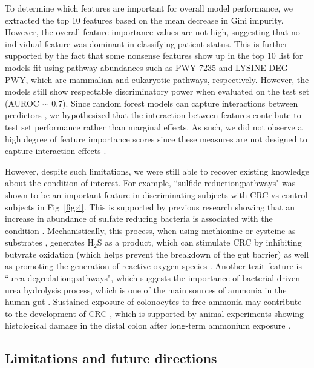 \documentclass{bmcart}
\begin{document}
To determine which features are important for overall model performance, we extracted the top 10 features based on the mean decrease in Gini impurity. However, the overall feature importance values are not high, suggesting that no individual feature was dominant in classifying patient status. This is further supported by the fact that some nonsense features show up in the top 10 list for models fit using pathway abundances such as PWY-7235 and LYSINE-DEG-PWY, which are mammalian and eukaryotic pathways, respectively. However, the models still show respectable discriminatory power when evaluated on the test set (AUROC $\sim$ 0.7). Since random forest models can capture interactions between predictors \cite{hastie2009elements}, we hypothesized that the interaction between features contribute to test set performance rather than marginal effects. As such, we did not observe a high degree of feature importance scores since these measures are not designed to capture interaction effects \cite{wright2016little}. 

However, despite such limitations, we were still able to recover existing knowledge about the condition of interest. For example, ``sulfide reduction;pathways" was shown to be an important feature in discriminating subjects with CRC vs control subjects in Fig~\ref{fig:4}. This is supported by previous research showing that an increase in abundance of sulfate reducing bacteria is associated with the condition \cite{yachida2019metagenomic}. Mechanistically, this process, when using methionine or cysteine as substrates \cite{cheng2020intestinal}, generates H$_2$S as a product, which can stimulate CRC by inhibiting butyrate oxidation (which helps prevent the breakdown of the gut barrier) as well as promoting the generation of reactive oxygen species \cite{marquet2009lactate}. Another trait feature is ``urea degredation;pathways", which suggests the importance of bacterial-driven urea hydrolysis process, which is one of the main sources of ammonia in the human gut \cite{blachier2007effects}. Sustained exposure of colonocytes to free ammonia may contribute to the development of CRC \cite{clausen1992fecal}, which is supported by animal experiments showing histological damage in the distal colon after long-term ammonium exposure \cite{lin1991colon}.      
\subsection*{Limitations and future directions}
\end{document}
